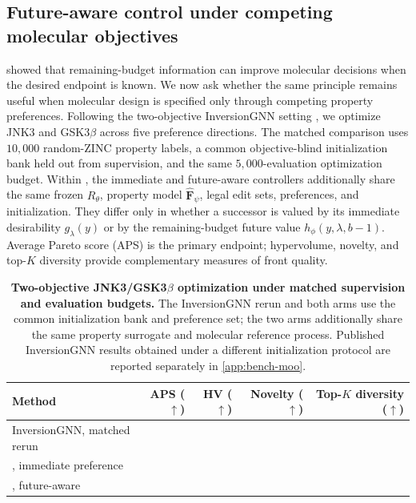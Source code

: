 

\subsection{Future-aware control under competing molecular objectives}
\label{sec:exp-multiobj}
\label{sec:exp-pareto}

 showed that remaining-budget information can improve molecular decisions when the desired endpoint is known. We now ask whether the same principle remains useful when molecular design is specified only through competing property preferences. Following the two-objective InversionGNN setting \citep{niu2025inversiongnn}, we optimize JNK3 and GSK3$\beta$ across five preference directions. The matched comparison uses $10{,}000$ random-ZINC property labels, a common objective-blind initialization bank held out from supervision, and the same $5{,}000$-evaluation optimization budget. Within \method{}, the immediate and future-aware controllers additionally share the same frozen $R_\theta$, property model $\widehat{\mathbf F}_\psi$, legal edit sets, preferences, and initialization. They differ only in whether a successor is valued by its immediate desirability $g_\lambda(y)$ or by the remaining-budget future value $h_\phi(y,\lambda,b-1)$. Average Pareto score (APS) is the primary endpoint; hypervolume, novelty, and top-$K$ diversity provide complementary measures of front quality.

\begin{table}[!ht]
\centering
{\small
\begin{tabular}{lrrrr}
\toprule
Method & APS ($\uparrow$) & HV ($\uparrow$) & Novelty ($\uparrow$) & Top-$K$ diversity ($\uparrow$) \\
\midrule
InversionGNN, matched rerun & \XXX{} & \XXX{} & \XXX{} & \XXX{} \\
\method{}, immediate preference & \XXX{} & \XXX{} & \XXX{} & \XXX{} \\
\method{}, future-aware & \XXX{} & \XXX{} & \XXX{} & \XXX{} \\
\bottomrule
\end{tabular}}
\caption{\small\textbf{Two-objective JNK3/GSK3$\beta$ optimization under matched supervision and evaluation budgets.} The InversionGNN rerun and both \method{} arms use the common initialization bank and preference set; the two \method{} arms additionally share the same property surrogate and molecular reference process. Published InversionGNN results obtained under a different initialization protocol are reported separately in \cref{app:bench-moo}.}
\label{tab:pareto}
\end{table}

